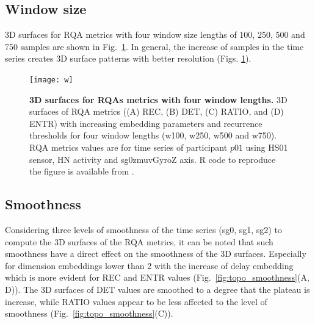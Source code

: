 \subsection{Window size}
3D surfaces for RQA metrics with four window size lengths
of 100, 250, 500 and 750 samples are shown in Fig.~\ref{fig:topo_windows}.
In general, the increase of samples in the time series creates 3D surface 
patterns with better resolution (Figs. \ref{fig:topo_windows}).
\begin{figure}[!ht]
\centering
\texttt{[image: w]}
    \caption{
	{\bf 3D surfaces for RQAs metrics with four window lengths.}
	3D surfaces of RQA metrics ((A) REC, (B) DET, (C) RATIO, and (D) ENTR) 
	with increasing embedding 
	parameters and recurrence thresholds for four window 
	lengths (w100, w250, w500 and  w750).
	RQA metrics values are for time series of participant $p01$ 
	using HS01 sensor, HN activity and sg0zmuvGyroZ axis.
	R code to reproduce the figure is available from \cite{hwum2018}.
        }
\label{fig:topo_windows}
\end{figure}


\subsection{Smoothness}
Considering three levels of smoothness of the time series (sg0, sg1, sg2) 
to compute the 3D surfaces of the RQA metrics, it can be noted that such 
smoothness have a direct effect on the smoothness of the 3D surfaces.
Especially for dimension embeddings lower than 2 with the increase of 
delay embedding which is more evident for REC and ENTR values 
(Fig.~\ref{fig:topo_smoothness}(A, D)).
The 3D surfaces of DET values are smoothed to a degree that the plateau 
is increase, while RATIO values appear to be less affected to the level 
of smoothness (Fig.~\ref{fig:topo_smoothness}(C)).

